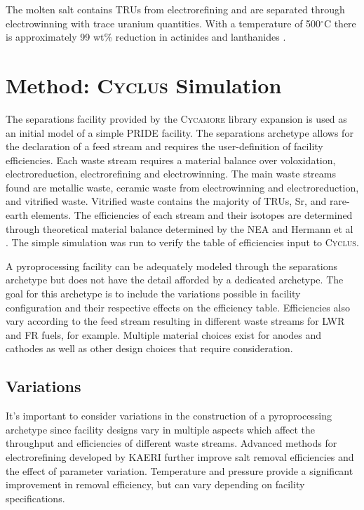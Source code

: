 \documentclass{anstrans}
\newcommand{\Cyclus}{\textsc{Cyclus}\xspace}%
\newcommand{\Cycamore}{\textsc{Cycamore}\xspace}%
\begin{document}
The molten salt contains TRUs from electrorefining and are separated through electrowinning with trace uranium quantities. With a temperature of 500$^{\circ}$C there is approximately 99 wt\% reduction in actinides and lanthanides \cite{flowsheet_1998}. 
\section{Method: \Cyclus Simulation}
The separations facility provided by the \Cycamore library expansion is used as an initial model of a simple PRIDE facility. The separations archetype allows for the declaration of a feed stream and requires the user-definition of facility efficiencies. Each waste stream requires a material balance over voloxidation, electroreduction, electrorefining and electrowinning. The main waste streams found are metallic waste, ceramic waste from electrowinning and electroreduction, and vitrified waste. Vitrified waste contains the majority of TRUs, Sr, and rare-earth elements. The efficiencies of each stream and their isotopes are determined through theoretical material balance determined by the NEA and Hermann et al \cite{flowsheet_1998,herrmann_separation_2010}. The simple simulation was run to verify the table of efficiencies input to \Cyclus.

A pyroprocessing facility can be adequately modeled through the separations archetype but does not have the detail afforded by a dedicated archetype. The goal for this archetype is to include the variations possible in facility configuration and their respective effects on the efficiency table. Efficiencies also vary according to the feed stream resulting in different waste streams for LWR and FR fuels, for example. Multiple material choices exist for anodes and cathodes as well as other design choices that require consideration. 

\subsection{Variations}
It's important to consider variations in the construction of a pyroprocessing archetype since facility designs vary in multiple aspects which affect the throughput and efficiencies of different waste streams. Advanced methods for electrorefining developed by KAERI \cite{lee_advanced_nodate} further improve salt removal efficiencies and the effect of parameter variation. Temperature and pressure provide a significant improvement in removal efficiency, but can vary depending on facility specifications. 
\end{document}
